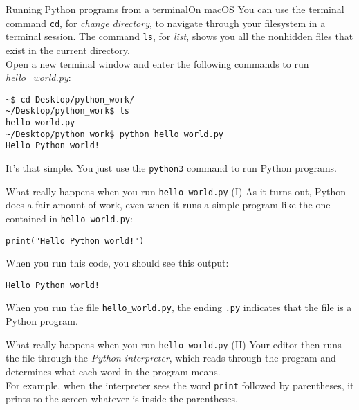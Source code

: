 \documentclass[aspectratio=169]{beamer}
\begin{document}
\begin{frame}[fragile]{Running Python programs from a terminal}{On macOS}
    You can use the terminal command \texttt{cd}, for \textit{change directory}, to navigate through your filesystem in a terminal session.
    The command \texttt{ls}, for \textit{list}, shows you all the nonhidden files that exist in the current directory. \\
    \vspace{10pt}
    Open a new terminal window and enter the following commands to run \textit{hello\_world.py}:
    \vspace{5pt}
    \begin{Verbatim}
~$ cd Desktop/python_work/
~/Desktop/python_work$ ls
hello_world.py
~/Desktop/python_work$ python hello_world.py
Hello Python world!
    \end{Verbatim}
    \vspace{10pt}
    It's that simple.
    You just use the \texttt{python3} command to run Python programs.
\end{frame}


\begin{frame}[fragile]{What really happens when you run \texttt{hello\_world.py} (I)}
    As it turns out, Python does a fair amount of work, even when it runs a simple program like the one contained in \texttt{hello\_world.py}:
    \vspace{5pt}
    \begin{Verbatim}
print("Hello Python world!") 
    \end{Verbatim}
    \vspace{15pt}
    When you run this code, you should see this output:
    \vspace{5pt}
    \begin{Verbatim}
Hello Python world!
    \end{Verbatim}
    \vspace{15pt}
    When you run the file \texttt{hello\_world.py}, the ending \texttt{.py} indicates that the file is a Python program. \\
\end{frame}


\begin{frame}[fragile]{What really happens when you run \texttt{hello\_world.py} (II)}
    Your editor then runs the file through the \textit{Python interpreter}, which reads through the program and determines what each word in the program means. \\
    \vspace{15pt}
    For example, when the interpreter sees the word \texttt{print} followed by parentheses, it prints to the screen whatever is inside the parentheses. \\
\end{frame}
\end{document}

